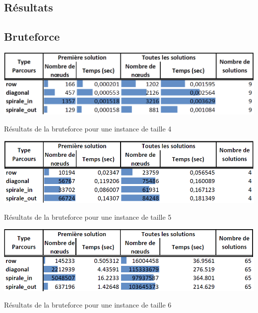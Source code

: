 \begin{appendices}
	\section{Résultats}
	\subsection{Bruteforce}\label{annexe:bruteforce}
	\begin{table}[H]
		\includegraphics[width=\linewidth]{images/resultat_bruteforce_4}
		\caption{Résultats de la bruteforce pour une instance de taille 4}
	\end{table}
	\begin{table}[H]
		\includegraphics[width=\linewidth]{images/resultat_bruteforce_5}
		\caption{Résultats de la bruteforce pour une instance de taille 5}
	\end{table}
	\begin{table}[H]
		\includegraphics[width=\linewidth]{images/resultat_bruteforce_6}
		\caption{Résultats de la bruteforce pour une instance de taille 6}
	\end{table}
	

\end{appendices}

